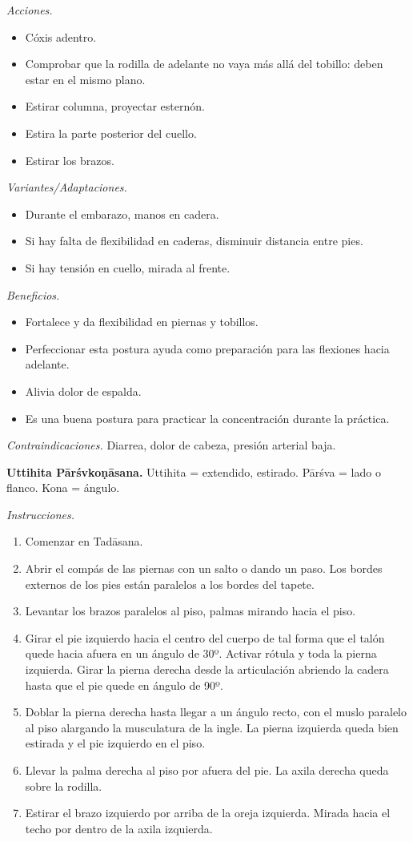 \emph{Acciones.}
\begin{itemize}
\item Cóxis adentro.
\item Comprobar que la rodilla de adelante no
vaya más allá del tobillo: deben estar en el
mismo plano.
\item Estirar columna, proyectar esternón.
\item Estira la parte posterior del cuello.
\item Estirar los brazos.
\end{itemize}

\emph{Variantes/Adaptaciones.}
\begin{itemize}
\item Durante el embarazo, manos en cadera.
\item Si hay falta de flexibilidad en
caderas, disminuir distancia entre pies.
\item Si hay tensión en cuello, mirada al
frente.
\end{itemize}

\emph{Beneficios.}
\begin{itemize}
\item Fortalece y da flexibilidad en piernas
y tobillos.
\item Perfeccionar esta postura ayuda como
preparación para las flexiones hacia
adelante.
\item Alivia dolor de espalda.
\item Es una buena postura para practicar la
concentración durante la práctica.
\end{itemize}

\emph{Contraindicaciones.} Diarrea, dolor de
cabeza, presión arterial baja.

\medskip\noindent\textbf{Uttihita
Pārśvkoṇāsana.}
Uttihita = extendido, estirado. Pārśva = lado
o flanco. Kona = ángulo.

\emph{Instrucciones.}
\begin{enumerate}
\item Comenzar en Tadāsana.
\item Abrir el compás de las piernas con un
salto o dando un paso. Los bordes externos de
los pies están paralelos a los bordes del
tapete.
\item Levantar los brazos paralelos al piso,
palmas mirando hacia el piso.
\item Girar el pie izquierdo hacia el centro
del cuerpo de tal forma que el talón quede
hacia afuera en un ángulo de 30º. Activar
rótula y toda la pierna izquierda. Girar la
pierna derecha desde la articulación abriendo
la cadera hasta que el pie quede en ángulo de
90º.
\item Doblar la pierna derecha hasta llegar a
un ángulo recto, con el muslo paralelo al
piso alargando la musculatura de la ingle. La
pierna izquierda queda bien estirada y el pie
izquierdo en el piso.
\item Llevar la palma derecha al piso por
afuera del pie. La axila derecha queda sobre
la rodilla.
\item Estirar el brazo izquierdo por arriba
de la oreja izquierda. Mirada hacia el techo
por dentro de la axila izquierda.
\end{enumerate}

